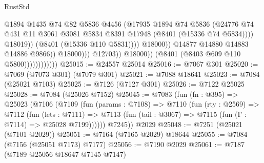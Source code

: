 \begin{lexlean}{RustStd}
\begin{coremodule}
                                                      @1894
                                                      @1435
                                                      @74
                                                      @82
                                                      @5836
                                                      @4456
                                                      (@17935
                                                        @1894
                                                        @74
                                                        @5836
                                                        (@24776
                                                          @74
                                                          @431
                                                          @11
                                                          @3061
                                                          @3081
                                                          @5834
                                                          @8391
                                                          @17948
                                                          (@8401 (@15336 @74 @5834))))
                                                      @18019))
                                                  (@8401 (@15336 @110 @5831))))
                                              @18000))
                                          @14877
                                          @14880
                                          @14883
                                          @14886
                                          @9866))
                                      @18000)))
                                @12703))
                            @18000))
                        (@8401 (@8403 @609 @110 @5800))))))))))))
@25015 := @24557 @25014
@25016 := @7067 @301
@25020 := @7069 (@7073 @301) (@7079 @301)
@25021 := @7088 @18641
@25023 := @7084 (@25021 @7103)
@25025 := @7126 (@7127 @301)
@25026 := @7122 @25025
@25028 := @7084 (@25026 @7152)
@25045 := @7083
    (fun (fn : @395) =>
    @25023
      (@7106
        (@7109
          (fun (params : @7108) =>
          @7110
            (fun (rty : @2569) =>
            @7112
              (fun (lets : @7111) =>
              @7113 (fun (tail : @3067) => @7115 (fun (Γ : @7114) => @25028 @7199))))))
        @7245))
    @2029
@25048 := @7251 (@25021 (@7101 @2029))
@25051 := @7164 (@7165 @2029) @18644
@25055 := @7084 (@7156 (@25051 @7173) @7177)
@25056 := @7190 @2029
@25061 := @7187 (@7189 @25056 @18647 @7145 @7147)

\end{coremodule}
\end{lexlean}
